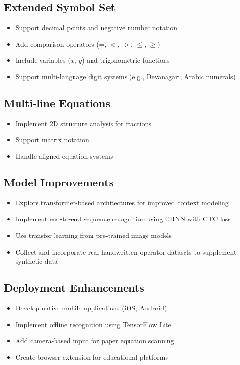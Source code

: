 \documentclass[conference]{IEEEtran}
\begin{document}
\subsection{Extended Symbol Set}

\begin{itemize}
    \item Support decimal points and negative number notation
    \item Add comparison operators (=, $<$, $>$, $\leq$, $\geq$)
    \item Include variables ($x$, $y$) and trigonometric functions
    \item Support multi-language digit systems (e.g., Devanagari, Arabic numerals)
\end{itemize}

\subsection{Multi-line Equations}

\begin{itemize}
    \item Implement 2D structure analysis for fractions
    \item Support matrix notation
    \item Handle aligned equation systems
\end{itemize}

\subsection{Model Improvements}

\begin{itemize}
    \item Explore transformer-based architectures for improved context modeling
    \item Implement end-to-end sequence recognition using CRNN with CTC loss
    \item Use transfer learning from pre-trained image models
    \item Collect and incorporate real handwritten operator datasets to supplement synthetic data
\end{itemize}

\subsection{Deployment Enhancements}

\begin{itemize}
    \item Develop native mobile applications (iOS, Android)
    \item Implement offline recognition using TensorFlow Lite
    \item Add camera-based input for paper equation scanning
    \item Create browser extension for educational platforms
\end{itemize}
\end{document}
